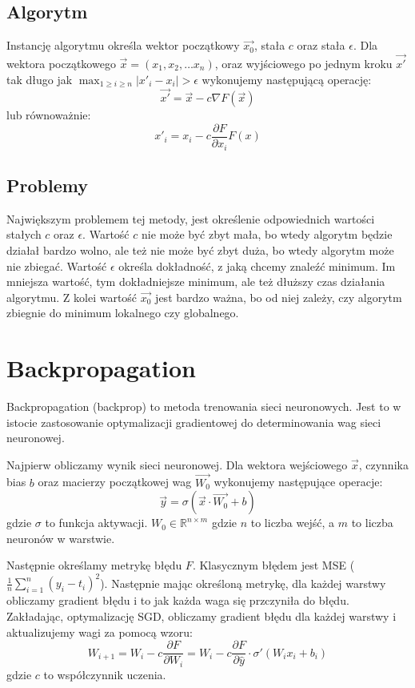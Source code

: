 \documentclass{../notatki}
\begin{document}
\subsection{Algorytm}

Instancję algorytmu określa wektor początkowy $\vec{x_0}$, stała $c$ oraz stała
$\epsilon$.
Dla wektora początkowego $\vec{x} = (x_1, x_2, \dots x_n)$, oraz wyjściowego
po jednym kroku $\vec{x'}$ tak długo jak $\max_{1 \ge i \ge n}|x'_i -
x_i| > \epsilon$ wykonujemy następującą operację:
$$
\vec{x'} = \vec{x} - c \nabla F(\vec{x})
$$
lub równoważnie:
$$
x'_i = x_i - c \frac{\partial F}{\partial x_i}F(x)
$$

\subsection{Problemy}

Największym problemem tej metody, jest określenie odpowiednich wartości stałych
$c$ oraz $\epsilon$. Wartość $c$ nie może być zbyt mała, bo wtedy algorytm
będzie działał bardzo wolno, ale też nie może być zbyt duża, bo wtedy algorytm
może nie zbiegać. Wartość $\epsilon$ określa dokładność, z jaką chcemy znaleźć
minimum. Im mniejsza wartość, tym dokładniejsze minimum, ale też dłuższy czas
działania algorytmu. Z kolei wartość $\vec{x_0}$ jest bardzo ważna, bo od niej
zależy, czy algorytm zbiegnie do minimum lokalnego czy globalnego.

\section{Backpropagation}

Backpropagation (backprop) to metoda trenowania sieci neuronowych. Jest to
w istocie zastosowanie optymalizacji gradientowej do determinowania wag sieci
neuronowej.

Najpierw obliczamy wynik sieci neuronowej. Dla wektora wejściowego $\vec{x}$,
czynnika bias $b$
oraz macierzy początkowej wag $\vec{W_0}$ wykonujemy następujące operacje:
$$
\vec{y} = \sigma(\vec{x} \cdot \vec{W_0} + b)
$$
gdzie $\sigma$ to funkcja aktywacji. $W_0 \in \mathbb{R}^{n \times m}$ gdzie $n$
to liczba wejść, a $m$ to liczba neuronów w warstwie.

Następnie określamy metrykę błędu $F$. Klasycznym błędem jest MSE
($\frac{1}{n} \sum_{i=1}^{n} (y_i - t_i)^2$). Następnie mając
określoną metrykę, dla każdej warstwy obliczamy gradient błędu i to jak każda
waga się przczyniła do błędu. Zakładając, optymalizację SGD, obliczamy gradient
błędu dla każdej warstwy i aktualizujemy wagi za pomocą wzoru:
$$
W_{i+1} = W_i - c \frac{\partial F}{\partial W_i} = W_i - c
\frac{\partial F}{\partial \hat{y}} \cdot \sigma'(W_i x_i + b_i)
$$
gdzie $c$ to współczynnik uczenia.
\end{document}
